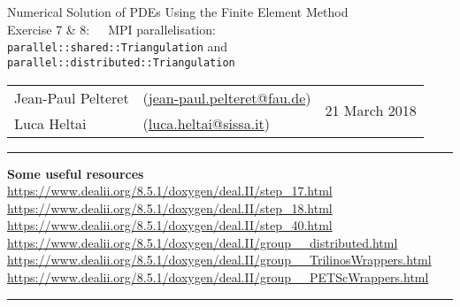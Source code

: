 \documentclass[11pt,answers]{exam}
\makeatletter
\newcommand{\makeheader}[3]{%
\setcounter{question}{0}
\begin{center}
{\sc Numerical Solution of PDEs Using the Finite Element Method}\vspace{2ex}\\
{\sc Exercise #1:\ \ \ #2}\vspace{2ex}\\
\begin{tabular*}{\textwidth}{ll @{\extracolsep{\fill}}r}
Jean-Paul Pelteret & (\url{jean-paul.pelteret@fau.de}) & \multirow{2}{*}{#3} \\
Luca Heltai & (\url{luca.heltai@sissa.it}) & \\
\end{tabular*}
\end{center}
}
\newcommand{\makeresources}[1]{%
\rule{\textwidth}{0.6mm}
\textbf{Some useful resources}\\[1.5ex]
#1 \\
\rule{\textwidth}{0.6mm}
}
\makeatother
\begin{document}


\clearpage
\makeheader{7 \& 8}{MPI parallelisation: \\\texttt{parallel::shared::Triangulation} and \texttt{parallel::distributed::Triangulation}}{21 March 2018}
\makeresources{%
\url{https://www.dealii.org/8.5.1/doxygen/deal.II/step_17.html} \\
\url{https://www.dealii.org/8.5.1/doxygen/deal.II/step_18.html} \\
\url{https://www.dealii.org/8.5.1/doxygen/deal.II/step_40.html} \\
\url{https://www.dealii.org/8.5.1/doxygen/deal.II/group__distributed.html} \\
\url{https://www.dealii.org/8.5.1/doxygen/deal.II/group__TrilinosWrappers.html} \\
\url{https://www.dealii.org/8.5.1/doxygen/deal.II/group__PETScWrappers.html}
}





\end{document}
